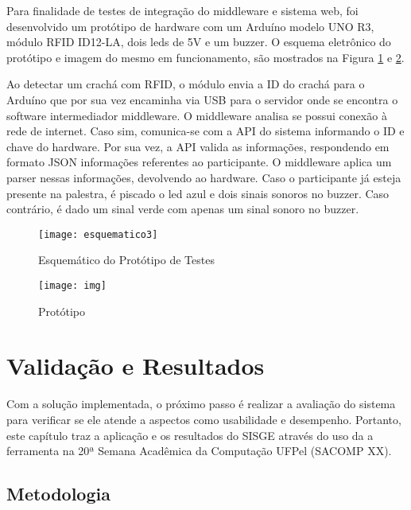 \documentclass[tcc,capa]{texufpel}
\begin{document}
                Para finalidade de testes de integração do middleware e sistema web,
                foi desenvolvido um protótipo de hardware com um Arduíno modelo UNO R3, módulo RFID ID12-LA, dois leds de 5V e um buzzer. O esquema eletrônico do protótipo e imagem do mesmo em funcionamento, são mostrados na Figura \ref{esquema1} e \ref{esquema2}.
                
                Ao detectar um crachá com RFID, o módulo envia a ID do crachá para o Arduíno que por sua vez encaminha via USB para o servidor onde se encontra o software intermediador middleware. O middleware analisa se possui conexão à rede de internet. Caso sim, comunica-se com a API do sistema informando o ID e chave do hardware. Por sua vez, a API valida as informações, respondendo em formato JSON informações referentes ao participante. O middleware aplica um parser nessas informações, devolvendo ao hardware. Caso o participante já esteja presente na palestra, é piscado o led azul e dois sinais sonoros no buzzer. Caso contrário, é dado um sinal verde com apenas um sinal sonoro no buzzer.
                
                \begin{figure}[H]
                    \centering 
                    \texttt{[image: esquematico3]}
                    \caption{Esquemático do Protótipo de Testes} 
                    \label{esquema1}
                \end{figure}
                
                \begin{figure}[H]
                    \centering 
                    \texttt{[image: img]}
                    \caption{Protótipo} 
                    \label{esquema2}
                \end{figure}
                
              
    


\chapter{Validação e Resultados}
    Com a solução implementada, o próximo passo é realizar a avaliação do sistema
    para verificar se ele atende a aspectos como usabilidade e desempenho. Portanto, este capítulo traz a aplicação e os resultados do SISGE através do uso da a ferramenta na 20ª Semana Acadêmica da Computação UFPel (SACOMP XX).
    
    
        \section{Metodologia}
        
\end{document}
